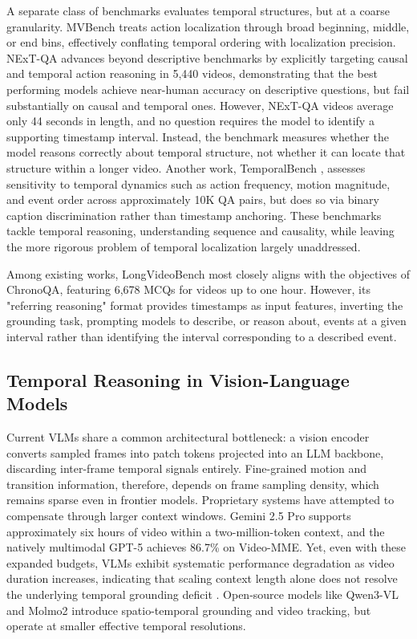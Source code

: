 \documentclass[sigconf,natbib=false,nonacm]{acmart}
\begin{document}
A separate class of benchmarks evaluates temporal structures, but at a coarse granularity. MVBench \cite{mvbench} treats action localization through broad beginning, middle, or end bins, effectively conflating temporal ordering with localization precision. NExT-QA \cite{nextqa} advances beyond descriptive benchmarks by explicitly targeting causal and temporal action reasoning in 5,440 videos, demonstrating that the best performing models achieve near-human accuracy on descriptive questions, but fail substantially on causal and temporal ones. However, NExT-QA videos average only 44 seconds in length, and no question requires the model to identify a supporting timestamp interval. Instead, the benchmark measures whether the model reasons correctly about temporal structure, not whether it can locate that structure within a longer video. Another work, TemporalBench \cite{temporalbench}, assesses sensitivity to temporal dynamics such as action frequency, motion magnitude, and event order across approximately 10K QA pairs, but does so via binary caption discrimination rather than timestamp anchoring. These benchmarks tackle temporal reasoning, understanding sequence and causality, while leaving the more rigorous problem of temporal localization largely unaddressed.

Among existing works, LongVideoBench \cite{lvbench} most closely aligns with the objectives of ChronoQA, featuring 6,678 MCQs for videos up to one hour. However, its "referring reasoning" format provides timestamps as input features, inverting the grounding task, prompting models to describe, or reason about, events at a given interval rather than identifying the interval corresponding to a described event. 


\subsection{Temporal Reasoning in Vision-Language Models}
Current VLMs share a common architectural bottleneck: a vision encoder converts sampled frames into patch tokens projected into an LLM backbone, discarding inter-frame temporal signals entirely. Fine-grained motion and transition information, therefore, depends on frame sampling density, which remains sparse even in frontier models. Proprietary systems have attempted to compensate through larger context windows. Gemini 2.5 Pro \cite{gemini2.5-video} supports approximately six hours of video within a two-million-token context, and the natively multimodal GPT-5 \cite{gpt-5} achieves 86.7\% on Video-MME. Yet, even with these expanded budgets, VLMs exhibit systematic performance degradation as video duration increases, indicating that scaling context length alone does not resolve the underlying temporal grounding deficit \cite{longvideosurvey}. Open-source models like Qwen3-VL and Molmo2 introduce spatio-temporal grounding and video tracking, but operate at smaller effective temporal resolutions.
\end{document}
